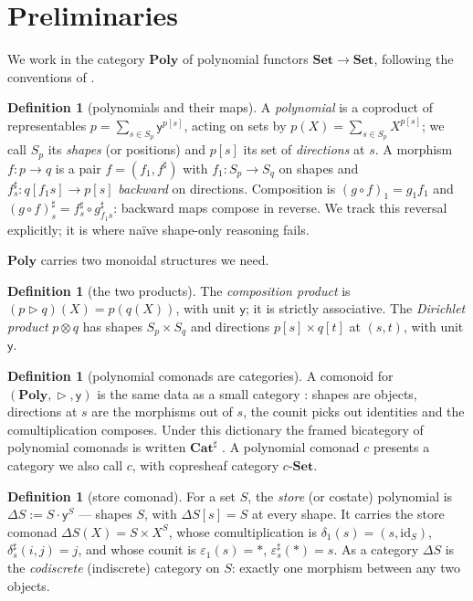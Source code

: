 \documentclass[11pt]{amsart}
\theoremstyle{plain}
\theoremstyle{definition}
\newtheorem{definition}[theorem]{Definition}
\theoremstyle{gap}
\newcommand{\Poly}{\mathbf{Poly}}
\newcommand{\Cathash}{\mathbf{Cat}^{\sharp}}
\newcommand{\Set}{\mathbf{Set}}
\renewcommand{\lhd}{\vartriangleright}
\newcommand{\Store}[1]{\Delta #1}
\newcommand{\yon}{\mathsf{y}}
\begin{document}
\section{Preliminaries}\label{sec:prelim}

We work in the category $\Poly$ of polynomial functors $\Set\to\Set$, following the
conventions of \cite{NiuSpivak}.

\begin{definition}[polynomials and their maps]
A \emph{polynomial} is a coproduct of representables
$p=\sum_{s\in S_p}\yon^{p[s]}$, acting on sets by $p(X)=\sum_{s\in S_p}X^{p[s]}$; we
call $S_p$ its \emph{shapes} (or positions) and $p[s]$ its set of \emph{directions}
at $s$. A morphism $f\colon p\to q$ is a pair $f=(f_1,f^{\sharp})$ with
$f_1\colon S_p\to S_q$ on shapes and $f^{\sharp}_s\colon q[f_1 s]\to p[s]$
\emph{backward} on directions. Composition is $(g\circ f)_1=g_1 f_1$ and
$(g\circ f)^{\sharp}_s=f^{\sharp}_s\circ g^{\sharp}_{f_1 s}$: backward maps compose
in reverse. We track this reversal explicitly; it is where naïve shape-only reasoning
fails.
\end{definition}

$\Poly$ carries two monoidal structures we need.

\begin{definition}[the two products]
The \emph{composition product} is $(p\lhd q)(X)=p(q(X))$, with unit $\yon$; it is
strictly associative. The \emph{Dirichlet product} $p\otimes q$ has shapes
$S_p\times S_q$ and directions $p[s]\times q[t]$ at $(s,t)$, with unit $\yon$.
\end{definition}

\begin{definition}[polynomial comonads are categories]
A comonoid for $(\Poly,\lhd,\yon)$ is the same data as a small category
\cite{AhmanUustalu,NiuSpivak}: shapes are objects, directions at $s$ are the
morphisms out of $s$, the counit picks out identities and the comultiplication
composes. Under this dictionary the framed bicategory of polynomial comonads is
written $\Cathash$ \cite{NiuSpivak}. A polynomial comonad $c$ presents a category we
also call $c$, with copresheaf category $c\text{-}\Set$.
\end{definition}

\begin{definition}[store comonad]\label{def:store}
For a set $S$, the \emph{store} (or costate) polynomial is $\Store{S}:=S\cdot\yon^{S}$
--- shapes $S$, with $\Store{S}[s]=S$ at every shape. It carries the store comonad
$\Store{S}(X)=S\times X^{S}$, whose comultiplication is
$\delta_1(s)=(s,\mathrm{id}_S)$, $\delta^{\sharp}_s(i,j)=j$, and whose counit is
$\varepsilon_1(s)=\ast$, $\varepsilon^{\sharp}_s(\ast)=s$. As a category $\Store{S}$
is the \emph{codiscrete} (indiscrete) category on $S$: exactly one morphism between
any two objects.
\end{definition}
\end{document}
